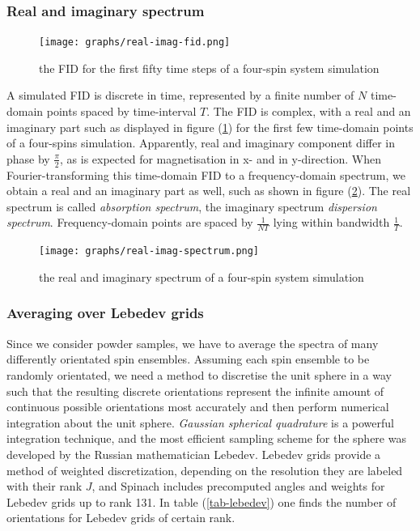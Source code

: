 \documentclass[11.5pt,a4paper]{article}
\begin{document}
\subsubsection{Real and imaginary spectrum}
\begin{figure}
        \centering
        \texttt{[image: graphs/real-imag-fid.png]}
	\caption{the FID for the first fifty time steps of a four-spin system simulation}
	\label{fig-rifid}
\end{figure}
A simulated FID is discrete in time, represented by a finite number of $N$ time-domain points spaced by time-interval $T$. The FID is complex, with a real and an imaginary part such as displayed in figure (\ref{fig-rifid}) for the first few time-domain points of a four-spins simulation. Apparently, real and imaginary component differ in phase by $\tfrac{\pi}{2}$, as is expected for magnetisation in x- and in y-direction. When Fourier-transforming this time-domain FID to a frequency-domain spectrum, we obtain a real and an imaginary part as well, such as shown in figure (\ref{fig-rispectrum}). The real spectrum is called \emph{absorption spectrum}, the imaginary spectrum \emph{dispersion spectrum}. Frequency-domain points are spaced by $\tfrac{1}{N T}$ lying within bandwidth $\tfrac{1}{T}$.
\begin{figure}
        \centering
        \texttt{[image: graphs/real-imag-spectrum.png]}
	\caption{the real and imaginary spectrum of a four-spin system simulation}
	\label{fig-rispectrum}
\end{figure}

\subsubsection{Averaging over Lebedev grids}
Since we consider powder samples, we have to average the spectra of many differently orientated spin ensembles. Assuming each spin ensemble to be randomly orientated, we need a method to discretise the unit sphere in a way such that the resulting discrete orientations represent the infinite amount of continuous possible orientations most accurately and then perform numerical integration about the unit sphere. \emph{Gaussian spherical quadrature} is a powerful integration technique, and the most efficient sampling scheme for the sphere was developed by the Russian mathematician Lebedev. Lebedev grids provide a method of weighted discretization, depending on the resolution they are labeled with their rank $J$, and Spinach includes precomputed angles and weights for Lebedev grids up to rank 131. In table (\ref{tab-lebedev}) one finds the number of orientations for Lebedev grids of certain rank. 
\end{document}
